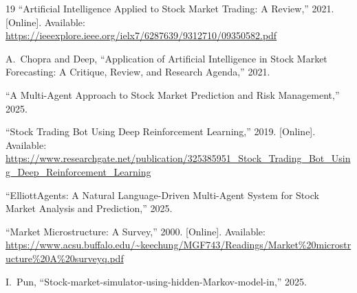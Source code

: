 \documentclass[conference]{IEEEtran}
\begin{document}
\begin{thebibliography}{19}
``Artificial Intelligence Applied to Stock Market Trading: A
Review,'' 2021. [Online]. Available:
\url{https://ieeexplore.ieee.org/ielx7/6287639/9312710/09350582.pdf}

A.~Chopra and Deep, ``Application of Artificial Intelligence in
Stock Market Forecasting: A Critique, Review, and Research Agenda,''
2021.

``A Multi-Agent Approach to Stock Market Prediction and Risk
Management,'' 2025.

``Stock Trading Bot Using Deep Reinforcement Learning,'' 2019.
[Online]. Available:
\url{https://www.researchgate.net/publication/325385951_Stock_Trading_Bot_Using_Deep_Reinforcement_Learning}

``ElliottAgents: A Natural Language-Driven Multi-Agent System for
Stock Market Analysis and Prediction,'' 2025.

``Market Microstructure: A Survey,'' 2000. [Online]. Available:
\url{https://www.acsu.buffalo.edu/~keechung/MGF743/Readings/Market%20microstructure%20A%20surveyq.pdf}

I.~Pun, ``Stock-market-simulator-using-hidden-Markov-model-in,''
2025.

\end{thebibliography}
\end{document}
